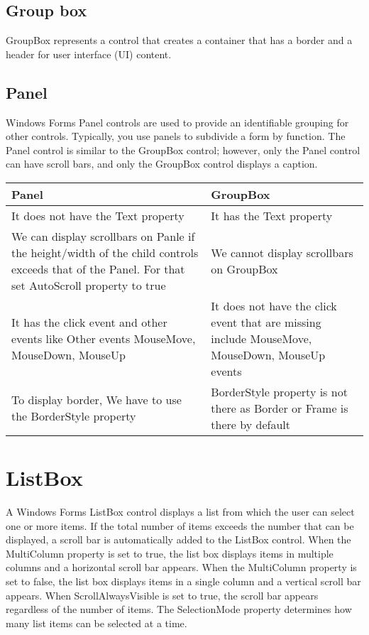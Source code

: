 \subsection{Group box}
GroupBox represents a control that creates a container that has a border and a header for user
interface (UI) content.

\subsection{Panel}
Windows Forms Panel controls are used to provide an identifiable grouping for other controls.
Typically, you use panels to subdivide a form by function. The Panel control is similar to the
GroupBox control; however, only the Panel control can have scroll bars, and only the GroupBox
control displays a caption.

\begin{longtable}[H]{p{5.5cm}p{5.5cm}}	
	\toprule
	\textbf{Panel} 			& \textbf{GroupBox} \\
	\midrule
	\endhead
	It does not have the Text property 		& It has the Text property\\
	
	We can display scrollbars on Panle if the height/width of the child controls exceeds that of the Panel. For that set AutoScroll property to true  & We cannot display scrollbars on GroupBox \\
	
	It has the click event and other events like Other events
	MouseMove, MouseDown, MouseUp & It does not have the click event
	that are missing include MouseMove, MouseDown, MouseUp events\\
	
To display border, We have to use the BorderStyle property & BorderStyle property is not there as Border or Frame is there by default \\

	\bottomrule
\end{longtable}

\section{ListBox}
A Windows Forms ListBox control displays a list from which the user can select one or more items.
If the total number of items exceeds the number that can be displayed, a scroll bar is automatically
added to the ListBox control. When the MultiColumn property is set to true, the list box displays
items in multiple columns and a horizontal scroll bar appears. When the MultiColumn property is
set to false, the list box displays items in a single column and a vertical scroll bar appears. When
ScrollAlwaysVisible is set to true, the scroll bar appears regardless of the number of items. The
SelectionMode property determines how many list items can be selected at a time.

